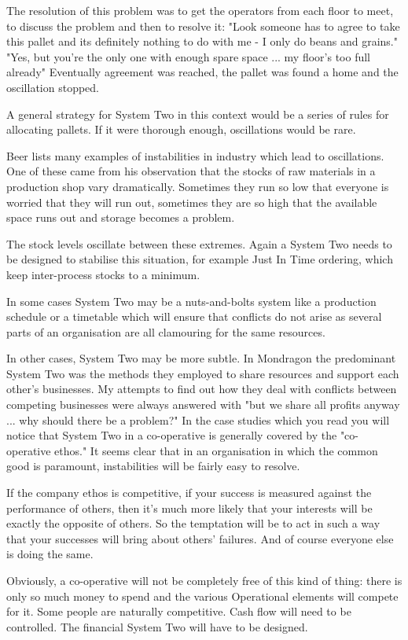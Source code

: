 The resolution of this problem was to get the operators from each floor to meet, to discuss the problem and then to resolve it: "Look someone has to agree to take this pallet and its definitely nothing to do with me - I only do beans and grains." "Yes, but you're the only one with enough spare space ... my floor's too full already" Eventually agreement was reached, the pallet was found a home and the oscillation stopped.

A general strategy for System Two in this context would be a series of rules for allocating pallets. If it were thorough enough, oscillations would be rare.

Beer lists many examples of instabilities in industry which lead to oscillations. One of these came from his observation that the stocks of raw materials in a production shop vary dramatically. Sometimes they run so low that everyone is worried that they will run out, sometimes they are so high that the available space runs out and storage becomes a problem.

The stock levels oscillate between these extremes. Again a System Two needs to be designed to stabilise this situation, for example Just In Time ordering, which keep inter-process stocks to a minimum.

In some cases System Two may be a nuts-and-bolts system like a production schedule or a timetable which will ensure that conflicts do not arise as several parts of an organisation are all clamouring for the same resources.

In other cases, System Two may be more subtle. In Mondragon the predominant System Two was the methods they employed to share resources and support each other's businesses. My attempts to find out how they deal with conflicts between competing businesses were always answered with "but we share all profits anyway ... why should there be a problem?" In the case studies which you read you will notice that System Two in a co-operative is generally covered by the "co-operative ethos." It seems clear that in an organisation in which the common good is paramount, instabilities will be fairly easy to resolve.

If the company ethos is competitive, if your success is measured against the performance of others, then it's much more likely that your interests will be exactly the opposite of others. So the temptation will be to act in such a way that your successes will bring about others' failures. And of course everyone else is doing the same.

Obviously, a co-operative will not be completely free of this kind of thing: there is only so much money to spend and the various Operational elements will compete for it. Some people are naturally competitive. Cash flow will need to be controlled. The financial System Two will have to be designed.

